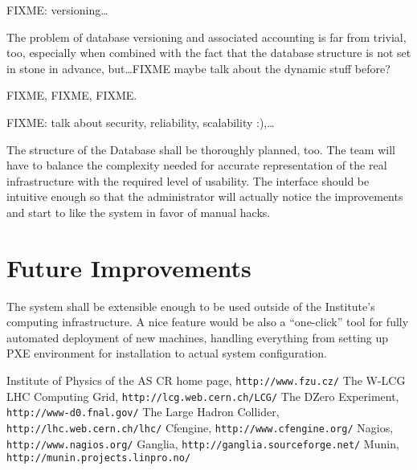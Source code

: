 \documentclass{article}
\begin{document}
FIXME: versioning\ldots

The problem of database versioning and associated accounting is far from trivial, too, especially when combined with the fact that
the database structure is not set in stone in advance, but\ldots FIXME maybe talk about the dynamic stuff before?

FIXME, FIXME, FIXME.

FIXME: talk about security, reliability, scalability :),\ldots

The structure of the Database shall be thoroughly planned, too.  The team will have to balance the complexity needed for accurate
representation of the real infrastructure with the required level of usability.  The interface should be intuitive enough so that
the administrator will actually notice the improvements and start to like the system in favor of manual hacks.

\section{Future Improvements}

The system shall be extensible enough to be used outside of the Institute's computing infrastructure.  A nice feature would be
also a ``one-click'' tool for fully automated deployment of new machines, handling everything from setting up PXE environment for
installation to actual system configuration.


\begin{thebibliography}{9}
    Institute of Physics of the AS CR home page, {\tt http://www.fzu.cz/}
    The W-LCG LHC Computing Grid, {\tt http://lcg.web.cern.ch/LCG/}
    The DZero Experiment, {\tt http://www-d0.fnal.gov/}
    The Large Hadron Collider, {\tt http://lhc.web.cern.ch/lhc/}
    Cfengine, {\tt http://www.cfengine.org/}
    Nagios, {\tt http://www.nagios.org/}
    Ganglia, {\tt http://ganglia.sourceforge.net/}
    Munin, {\tt http://munin.projects.linpro.no/}
\end{thebibliography}
\end{document}

